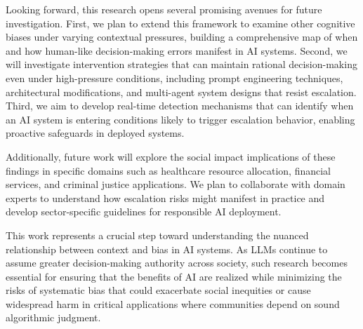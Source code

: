 \documentclass[letterpaper]{article} %
\begin{document}
Looking forward, this research opens several promising avenues for future investigation. First, we plan to extend this framework to examine other cognitive biases under varying contextual pressures, building a comprehensive map of when and how human-like decision-making errors manifest in AI systems. Second, we will investigate intervention strategies that can maintain rational decision-making even under high-pressure conditions, including prompt engineering techniques, architectural modifications, and multi-agent system designs that resist escalation. Third, we aim to develop real-time detection mechanisms that can identify when an AI system is entering conditions likely to trigger escalation behavior, enabling proactive safeguards in deployed systems.

Additionally, future work will explore the social impact implications of these findings in specific domains such as healthcare resource allocation, financial services, and criminal justice applications. We plan to collaborate with domain experts to understand how escalation risks might manifest in practice and develop sector-specific guidelines for responsible AI deployment.

This work represents a crucial step toward understanding the nuanced relationship between context and bias in AI systems. As LLMs continue to assume greater decision-making authority across society, such research becomes essential for ensuring that the benefits of AI are realized while minimizing the risks of systematic bias that could exacerbate social inequities or cause widespread harm in critical applications where communities depend on sound algorithmic judgment.

\end{document}
